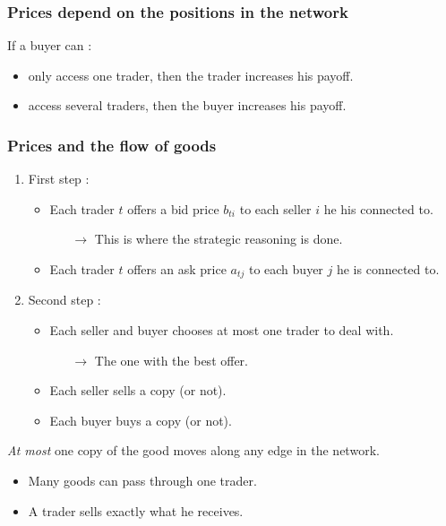 \subsubsection{Prices depend on the positions in the network}

If a buyer can :
\begin{itemize}
\item only access one trader, then the trader increases his payoff.
\item access several traders, then the buyer increases his payoff.
\end{itemize}

\subsubsection{Prices and the flow of goods}

\begin{enumerate}
\item First step :
	\begin{itemize}
	\item Each trader $t$ offers a bid price $b_{ti}$ to each seller $i$ he his connected to.
		\begin{itemize}
		\item[$\rightarrow$] This is where the strategic reasoning is done.
		\end{itemize}
	\item Each trader $t$ offers an ask price $a_{tj}$ to each buyer $j$ he is connected to.
	\end{itemize}
\item Second step :
	\begin{itemize}
	\item Each seller and buyer chooses at most one trader to deal with.
		\begin{itemize}
		\item[$\rightarrow$] The one with the best offer.
		\end{itemize}
	\item Each seller sells a copy (or not).
	\item Each buyer buys a copy (or not).
	\end{itemize}
\end{enumerate}

\textit{At most} one copy of the good moves along any edge in the network.

\begin{itemize}
\item Many goods can pass through one trader.
\item A trader sells exactly what he receives.
\end{itemize}

